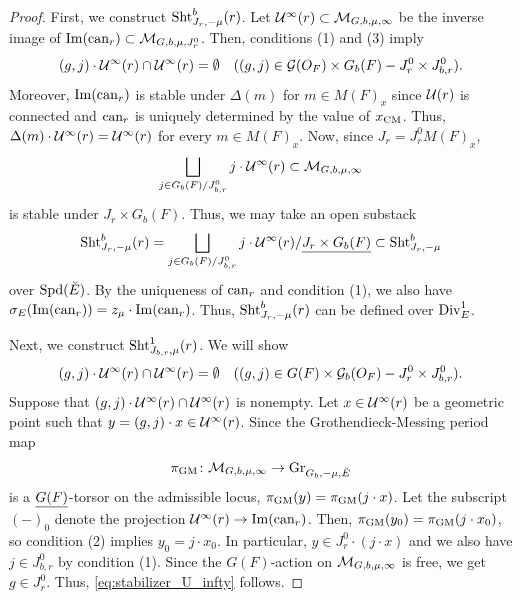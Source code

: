 \documentclass[12pt,reqno]{amsart}
\begin{document}
\begin{proof}
    First, we construct ${\operatorname{Sht}}_{J_r, -\mu}^b(r)$. Let ${\mathcal{U}}^\infty(r) \subset {\mathcal{M}}_{G, b, \mu, \infty}$ be the inverse image of ${\operatorname{Im}}({\operatorname{can}}_r) \subset {\mathcal{M}}_{G, b, \mu, J^0_r}$. Then, conditions (1) and (3) imply 
    \[
        (g, j) \cdot {\mathcal{U}}^\infty(r) \cap {\mathcal{U}}^\infty(r) = \emptyset \quad ((g, j) \in {\mathcal{G}}(O_F) \times G_b(F) - J^0_r \times J^0_{b, r}).
    \]
    Moreover, ${\operatorname{Im}}({\operatorname{can}}_r)$ is stable under $\Delta(m)$ for $m \in M(F)_x$ since ${\mathcal{U}}(r)$ is connected and ${\operatorname{can}}_r$ is uniquely determined by the value of $x_{\operatorname{CM}}$. Thus, $\Delta(m) \cdot {\mathcal{U}}^\infty(r) = {\mathcal{U}}^\infty(r)$ for every $m \in M(F)_x$. Now, since $J_r = J_r^0 M(F)_x$, 
    \[
        \bigsqcup_{j \in G_b(F) / J_{b, r}^0} j \cdot {\mathcal{U}}^\infty(r) \subset {\mathcal{M}}_{G, b, \mu, \infty}
    \]
    is stable under $J_r \times G_b(F)$. Thus, we may take an open substack 
    \[
        {\operatorname{Sht}}_{J_r, -\mu}^b(r) = \bigsqcup_{j \in G_b(F) / J_{b, r}^0} j \cdot {\mathcal{U}}^\infty(r) / {\underline{J_r \times G_b(F)}} \subset {\operatorname{Sht}}_{J_r, -\mu}^b 
    \]
    over ${\operatorname{Spd}}(\breve{E})$. By the uniqueness of ${\operatorname{can}}_r$ and condition (1), we also have $\sigma_E({\operatorname{Im}}({\operatorname{can}}_r)) = z_\mu \cdot {\operatorname{Im}}({\operatorname{can}}_r)$. Thus, ${\operatorname{Sht}}_{J_r, -\mu}^b(r)$ can be defined over ${\operatorname{Div}}_E^1$. 

    Next, we construct ${\operatorname{Sht}}_{J_{b, r}, \mu}^1(r)$. We will show 
    \begin{equation} \label{eq:stabilizer_U_infty}
        (g, j) \cdot {\mathcal{U}}^\infty(r) \cap {\mathcal{U}}^\infty(r) = \emptyset \quad ((g, j) \in G(F) \times {\mathcal{G}}_b(O_F) - J^0_{r} \times J^0_{b, r}).
    \end{equation} 
    Suppose that $(g, j) \cdot {\mathcal{U}}^\infty(r) \cap {\mathcal{U}}^\infty(r)$ is nonempty. Let $x \in {\mathcal{U}}^\infty(r)$ be a geometric point such that $y = (g, j) \cdot x \in {\mathcal{U}}^\infty(r)$. Since the Grothendieck-Messing period map
    \[
        \pi_{{\operatorname{GM}}} \colon {\mathcal{M}}_{G, b, \mu, \infty} \to {\operatorname{Gr}}_{G_b, -\mu, \breve{E}}
    \]
    is a ${\underline{G(F)}}$-torsor on the admissible locus, $\pi_{\operatorname{GM}}(y) = \pi_{\operatorname{GM}}(j \cdot x)$. Let the subscript $(-)_0$ denote the projection ${\mathcal{U}}^\infty(r) \to {\operatorname{Im}}({\operatorname{can}}_r)$. Then, $\pi_{\operatorname{GM}}(y_0) = \pi_{\operatorname{GM}}(j \cdot x_0)$, so condition (2) implies $y_0 = j \cdot x_0$. In particular, $y \in J^0_r \cdot (j \cdot x)$ and we also have $j \in J^0_{b, r}$ by condition (1). Since the $G(F)$-action on ${\mathcal{M}}_{G, b, \mu, \infty}$ is free, we get $g \in J^0_r$. Thus, \eqref{eq:stabilizer_U_infty} follows. 
    

\end{proof}
\end{document}

